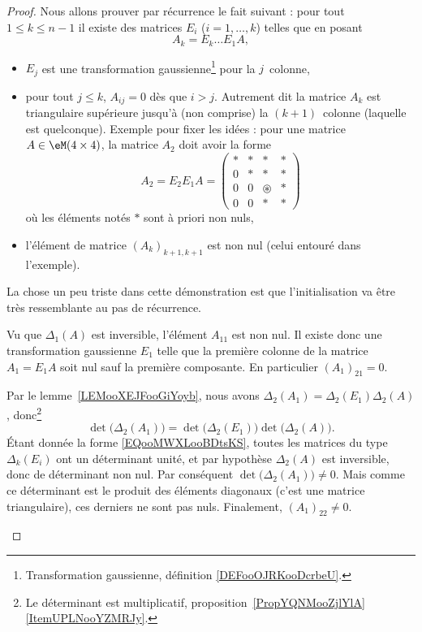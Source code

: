 \begin{proof}
	Nous allons prouver par récurrence le fait suivant : pour tout \( 1\leq k\leq n-1\) il existe des matrices \( E_i\) (\( i=1,\ldots, k\)) telles que en posant
	\begin{equation}
		A_k=E_{k}\ldots E_1A,
	\end{equation}
	\begin{itemize}
		\item \( E_j\) est une transformation gaussienne\footnote{Transformation gaussienne, définition \ref{DEFooOJRKooDcrbeU}.} pour la \( j\)\ieme\ colonne,
		\item pour tout \( j\leq k\), \( A_{ij}=0\) dès que \( i>j\). Autrement dit la matrice \( A_k\) est triangulaire supérieure jusqu'à (non comprise) la \( (k+1)\)\ieme\ colonne (laquelle est quelconque). Exemple pour fixer les idées : pour une matrice \( A\in \eM(4\times 4) \), la matrice \( A_2\) doit avoir la forme
		      \begin{equation}
			      A_2=E_2E_1A=\begin{pmatrix}
				      * & * & *           & * \\
				      0 & * & *           & * \\
				      0 & 0 & \circledast & * \\
				      0 & 0 & *           & *
			      \end{pmatrix}
		      \end{equation}
		      où les éléments notés \(*\) sont à priori non nuls,
		\item l'élément de matrice \( (A_k)_{ k+1,k+1  }  \) est non nul (celui entouré dans l'exemple).
	\end{itemize}

	La chose un peu triste dans cette démonstration est que l'initialisation va être très ressemblante au pas de récurrence.
	\begin{subproof}
		\spitem[Initialisation : \( k=1\)]

		Vu que \( \Delta_1(A)\) est inversible, l'élément \( A_{11}\) est non nul. Il existe donc une transformation gaussienne \( E_1\) telle que la première colonne de la matrice \( A_1=E_1A\) soit nul sauf la première composante. En particulier \( (A_1)_{21}=0\).

		Par le lemme~\ref{LEMooXEJFooGiYoyb}, nous avons \( \Delta_2(A_1)=\Delta_2(E_1)\Delta_2(A)\), donc\footnote{Le déterminant est multiplicatif, proposition~\ref{PropYQNMooZjlYlA}\ref{ItemUPLNooYZMRJy}.}
		\begin{equation}
			\det\big( \Delta_2(A_1) \big)=\det\big( \Delta_2(E_1) \big)\det\big( \Delta_2(A) \big).
		\end{equation}
		Étant donnée la forme \eqref{EQooMWXLooBDtsKS}, toutes les matrices du type \( \Delta_k(E_i)\) ont un déterminant unité, et par hypothèse \( \Delta_2(A)\) est inversible, donc de déterminant non nul. Par conséquent \( \det\big( \Delta_2(A_1) \big)\neq 0\). Mais comme ce déterminant est le produit des éléments diagonaux (c'est une matrice triangulaire), ces derniers ne sont pas nuls. Finalement, \( (A_1)_{22}\neq 0\).


\end{subproof}
\end{proof}
